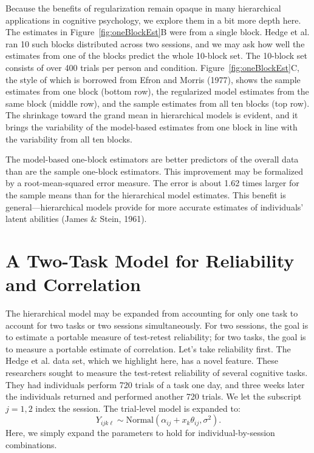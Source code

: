 \documentclass[english,man]{apa6}
\theoremstyle{definition}
\theoremstyle{definition}
\theoremstyle{definition}
\theoremstyle{remark}
\begin{document}
Because the benefits of regularization remain opaque in many
hierarchical applications in cognitive psychology, we explore them in a
bit more depth here. The estimates in Figure~\ref{fig:oneBlockEst}B were
from a single block. Hedge et al. ran 10 such blocks distributed across
two sessions, and we may ask how well the estimates from one of the
blocks predict the whole 10-block set. The 10-block set consists of over
400 trials per person and condition. Figure~\ref{fig:oneBlockEst}C, the
style of which is borrowed from Efron and Morris (1977), shows the
sample estimates from one block (bottom row), the regularized model
estimates from the same block (middle row), and the sample estimates
from all ten blocks (top row). The shrinkage toward the grand mean in
hierarchical models is evident, and it brings the variability of the
model-based estimates from one block in line with the variability from
all ten blocks.

The model-based one-block estimators are better predictors of the
overall data than are the sample one-block estimators. This improvement
may be formalized by a root-mean-squared error measure. The error is
about 1.62 times larger for the sample means than for the hierarchical
model estimates. This benefit is general---hierarchical models provide
for more accurate estimates of individuals' latent abilities (James \&
Stein, 1961).

\section{A Two-Task Model for Reliability and
Correlation}\label{a-two-task-model-for-reliability-and-correlation}

The hierarchical model may be expanded from accounting for only one task
to account for two tasks or two sessions simultaneously. For two
sessions, the goal is to estimate a portable measure of test-retest
reliability; for two tasks, the goal is to measure a portable estimate
of correlation. Let's take reliability first. The Hedge et al. data set,
which we highlight here, has a novel feature. These researchers sought
to measure the test-retest reliability of several cognitive tasks. They
had individuals perform 720 trials of a task one day, and three weeks
later the individuals returned and performed another 720 trials. We let
the subscript \(j=1,2\) index the session. The trial-level model is
expanded to: \[
Y_{ijk\ell} \sim \mbox{Normal}(\alpha_{ij}+x_k\theta_{ij},\sigma^2).
\] Here, we simply expand the parameters to hold for
individual-by-session combinations.
\end{document}
